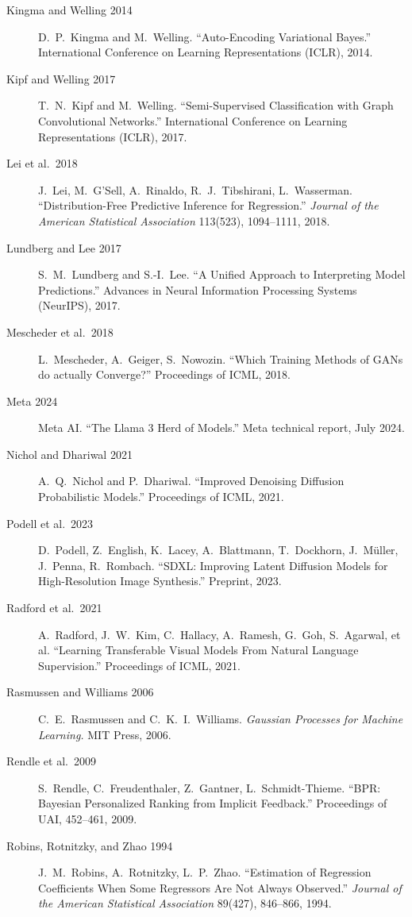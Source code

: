 \documentclass{article}
\begin{document}
\begin{description}
\item[Kingma and Welling 2014] D.\ P.\ Kingma and M.\ Welling. ``Auto-Encoding Variational Bayes.'' International Conference on Learning Representations (ICLR), 2014.
\item[Kipf and Welling 2017] T.\ N.\ Kipf and M.\ Welling. ``Semi-Supervised Classification with Graph Convolutional Networks.'' International Conference on Learning Representations (ICLR), 2017.
\item[Lei et al.\ 2018] J.\ Lei, M.\ G'Sell, A.\ Rinaldo, R.\ J.\ Tibshirani, L.\ Wasserman. ``Distribution-Free Predictive Inference for Regression.'' \emph{Journal of the American Statistical Association} 113(523), 1094--1111, 2018.
\item[Lundberg and Lee 2017] S.\ M.\ Lundberg and S.-I.\ Lee. ``A Unified Approach to Interpreting Model Predictions.'' Advances in Neural Information Processing Systems (NeurIPS), 2017.
\item[Mescheder et al.\ 2018] L.\ Mescheder, A.\ Geiger, S.\ Nowozin. ``Which Training Methods of GANs do actually Converge?'' Proceedings of ICML, 2018.
\item[Meta 2024] Meta AI. ``The Llama 3 Herd of Models.'' Meta technical report, July 2024.
\item[Nichol and Dhariwal 2021] A.\ Q.\ Nichol and P.\ Dhariwal. ``Improved Denoising Diffusion Probabilistic Models.'' Proceedings of ICML, 2021.
\item[Podell et al.\ 2023] D.\ Podell, Z.\ English, K.\ Lacey, A.\ Blattmann, T.\ Dockhorn, J.\ M\"uller, J.\ Penna, R.\ Rombach. ``SDXL: Improving Latent Diffusion Models for High-Resolution Image Synthesis.'' Preprint, 2023.
\item[Radford et al.\ 2021] A.\ Radford, J.\ W.\ Kim, C.\ Hallacy, A.\ Ramesh, G.\ Goh, S.\ Agarwal, et al. ``Learning Transferable Visual Models From Natural Language Supervision.'' Proceedings of ICML, 2021.
\item[Rasmussen and Williams 2006] C.\ E.\ Rasmussen and C.\ K.\ I.\ Williams. \emph{Gaussian Processes for Machine Learning.} MIT Press, 2006.
\item[Rendle et al.\ 2009] S.\ Rendle, C.\ Freudenthaler, Z.\ Gantner, L.\ Schmidt-Thieme. ``BPR: Bayesian Personalized Ranking from Implicit Feedback.'' Proceedings of UAI, 452--461, 2009.
\item[Robins, Rotnitzky, and Zhao 1994] J.\ M.\ Robins, A.\ Rotnitzky, L.\ P.\ Zhao. ``Estimation of Regression Coefficients When Some Regressors Are Not Always Observed.'' \emph{Journal of the American Statistical Association} 89(427), 846--866, 1994.

\end{description}
\end{document}
